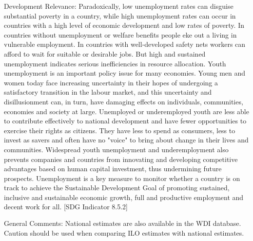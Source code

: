 \documentclass[a4paper]{article}
\begin{document}
Development Relevance: Paradoxically, low unemployment rates can disguise substantial poverty in a country, while high unemployment rates can occur in countries with a high level of economic development and low rates of poverty. In countries without unemployment or welfare benefits people eke out a living in vulnerable employment. In countries with well-developed safety nets workers can afford to wait for suitable or desirable jobs. But high and sustained unemployment indicates serious inefficiencies in resource allocation. Youth unemployment is an important policy issue for many economies. Young men and women today face increasing uncertainty in their hopes of undergoing a satisfactory transition in the labour market, and this uncertainty and disillusionment can, in turn, have damaging effects on individuals, communities, economies and society at large. Unemployed or underemployed youth are less able to contribute effectively to national development and have fewer opportunities to exercise their rights as citizens. They have less to spend as consumers, less to invest as savers and often have no "voice" to bring about change in their lives and communities. Widespread youth unemployment and underemployment also prevents companies and countries from innovating and developing competitive advantages based on human capital investment, thus undermining future prospects. Unemployment is a key measure to monitor whether a country is on track to achieve the Sustainable Development Goal of promoting sustained, inclusive and sustainable economic growth, full and productive employment and decent work for all. [SDG Indicator 8.5.2]

General Comments: National estimates are also available in the WDI database. Caution should be used when comparing ILO estimates with national estimates.
\end{document}
